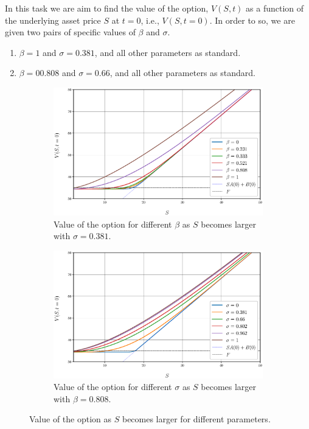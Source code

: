 In this task we are aim to find the value of the option, $V(S,t)$ as a function of the underlying asset price $S$ at $t=0$, i.e., $V(S,t=0)$. In order to so, we are given two pairs of specific values of $\beta$ and $\sigma$. 
\begin{enumerate}[wide, labelindent=1cm]
	\item $\beta=1$ and $\sigma = 0.381$, and all other parameters as standard.
	\item $\beta=0 0.808$ and $\sigma=0.66$, and all other parameters as standard.
\end{enumerate}
\vspace{-0.3cm}
\begin{figure}[htbp]
	\centering
	\captionsetup{width=.5\linewidth}
	\begin{subfigure}[b]{0.49\textwidth}
		\includegraphics[width=\textwidth]{img/Q1/ComparisonDifferentBetas_sigma06600.eps}
		\captionsetup{width=.8\linewidth}
		\caption{Value of the option for different $\beta$ as $S$ becomes larger with $\sigma = 0.381$.}
		\label{changingBeta}
	\end{subfigure}
	\begin{subfigure}[b]{0.49\textwidth}
		\includegraphics[width=\textwidth]{img/Q1/ComparisonDifferentSigmas_beta0808.eps}
		\captionsetup{width=.8\linewidth}
		\caption{Value of the option for different $\sigma$ as $S$ becomes larger with $\beta=0.808$.}
		\label{changingSigma}
	\end{subfigure}
	\caption{Value of the option as $S$ becomes larger for different parameters.}
	\label{S_larger}
\end{figure}
